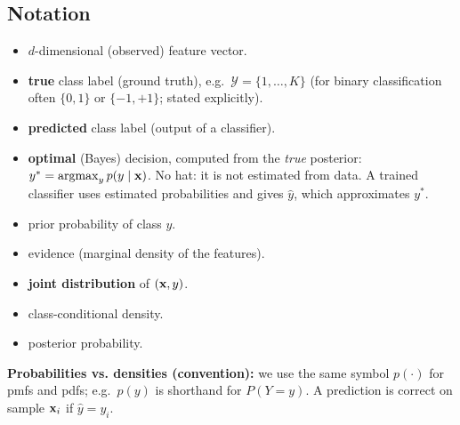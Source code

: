 	\subsection{Notation}
	\begin{itemize}
		\item[ $\vect x \in \mathbb{R}^d:$] $d$-dimensional (observed) feature vector.
		\item[$y\in\mathcal{Y}:$] \textbf{true} class label (ground truth), e.g.\ $\mathcal{Y}=\{1,\dots,K\}$ (for binary classification often $\{0,1\}$ or $\{-1,+1\}$; stated explicitly).
		\item[$\hat y:$] \textbf{predicted} class label (output of a classifier).
		\item[$y^*:$] \textbf{optimal} (Bayes) decision, computed from the \emph{true} posterior: $y^*=\operatorname*{argmax}_y p(y\mid\bm{\mathrm{x}})$. No hat: it is not estimated from data. A trained classifier uses estimated probabilities and gives $\hat y$, which approximates $y^*$.
		\item[$p(y):$] prior probability of class $y$.
		\item[$p(\vect x):$] evidence (marginal density of the features).
		\item[$p(\vect x , y):$] \textbf{joint distribution} of $(\bm{\mathrm{x}},y)$.
		\item[$p(\vect x \mid y):$] class-conditional density.
		\item[$p(y\mid \vect x):$] posterior probability.
	\end{itemize}

\noindent\textbf{Probabilities vs. densities (convention):} we use the same symbol $p(\cdot)$ for pmfs and pdfs; e.g.\ $p(y)$ is shorthand for $P(Y=y)$. A prediction is correct on sample $\bm{\mathrm{x}}_i$ if $\hat y = y_i$.

